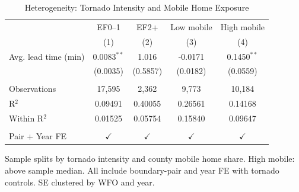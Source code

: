 
\begin{table}[htbp]
   \caption{\label{tab:het} Heterogeneity: Tornado Intensity and Mobile Home Exposure}
   \bigskip
   \centering
   \begin{tabular}{lcccc}
      \toprule
                           & EF0--1        & EF2+          & Low mobile    & High mobile \\   
                           & (1)           & (2)           & (3)           & (4)\\  
      \midrule 
      Avg. lead time (min) & 0.0083$^{**}$ & 1.016         & -0.0171       & 0.1450$^{**}$\\   
                           & (0.0035)      & (0.5857)      & (0.0182)      & (0.0559)\\   
       \\
      Observations         & 17,595        & 2,362         & 9,773         & 10,184\\  
      R$^2$                & 0.09491       & 0.40055       & 0.26561       & 0.14168\\  
      Within R$^2$         & 0.01525       & 0.05754       & 0.15840       & 0.09647\\  
       \\
      Pair + Year FE       & $\checkmark$  & $\checkmark$  & $\checkmark$  & $\checkmark$\\   
      \bottomrule
   \end{tabular}
   
   \par \raggedright 
   Sample splits by tornado intensity and county mobile home share. High mobile: above sample median. All include boundary-pair and year FE with tornado controls. SE clustered by WFO and year.
\end{table}


